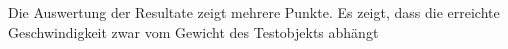 Die Auswertung der Resultate zeigt mehrere Punkte. Es zeigt, dass die erreichte Geschwindigkeit zwar vom Gewicht des Testobjekts abhängt